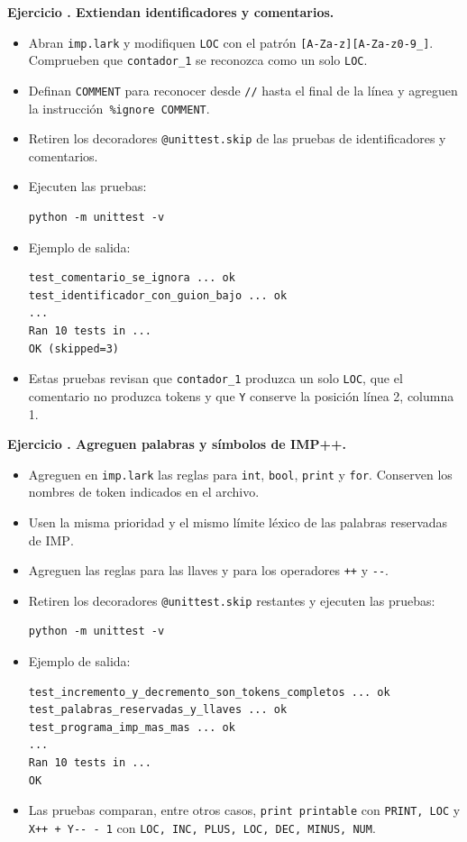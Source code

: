 \documentclass[11pt,spanish]{article}
\newcounter{ejercicio}
\newcommand{\ejercicio}[1]{%
  \stepcounter{ejercicio}%
  \textbf{Ejercicio \theejercicio. #1}%
}
\begin{document}
\ejercicio{Extiendan identificadores y comentarios.}
\begin{itemize}
  \item Abran \texttt{imp.lark} y modifiquen \texttt{LOC} con el patrón \texttt{[A-Za-z][A-Za-z0-9\_]\allowbreak*}. Comprueben que \texttt{contador\_1} se reconozca como un solo \texttt{LOC}.
  \item Definan \texttt{COMMENT} para reconocer desde \texttt{//} hasta el final de la línea y agreguen la instrucción~\texttt{\%ignore COMMENT}.
  \item Retiren los decoradores \texttt{@unittest.skip} de las pruebas de identificadores y comentarios.
  \item Ejecuten las pruebas:
\begin{lstlisting}[language={}]
python -m unittest -v
\end{lstlisting}
  \item Ejemplo de salida:
\begin{lstlisting}[language={}]
test_comentario_se_ignora ... ok
test_identificador_con_guion_bajo ... ok
...
Ran 10 tests in ...
OK (skipped=3)
\end{lstlisting}
  \item Estas pruebas revisan que \texttt{contador\_1} produzca un solo \texttt{LOC}, que el comentario no produzca tokens y que \texttt{Y} conserve la posición línea 2, columna 1.
\end{itemize}

\ejercicio{Agreguen palabras y símbolos de \textsc{IMP++}.}
\begin{itemize}
  \item Agreguen en \texttt{imp.lark} las reglas para \texttt{int}, \texttt{bool}, \texttt{print} y \texttt{for}. Conserven los nombres de token indicados en el archivo.
  \item Usen la misma prioridad y el mismo límite léxico de las palabras reservadas de \textsc{IMP}.
  \item Agreguen las reglas para las llaves y para los operadores \texttt{++} y \texttt{-{}-}.
  \item Retiren los decoradores \texttt{@unittest.skip} restantes y ejecuten las pruebas:
\begin{lstlisting}[language={}]
python -m unittest -v
\end{lstlisting}
  \item Ejemplo de salida:
\begin{lstlisting}[language={}]
test_incremento_y_decremento_son_tokens_completos ... ok
test_palabras_reservadas_y_llaves ... ok
test_programa_imp_mas_mas ... ok
...
Ran 10 tests in ...
OK
\end{lstlisting}
  \item Las pruebas comparan, entre otros casos, \texttt{print printable} con \texttt{PRINT, LOC} y \texttt{X++ + Y-{}- - 1} con \texttt{LOC, INC, PLUS, LOC, DEC, MINUS, NUM}.
\end{itemize}
\end{document}
